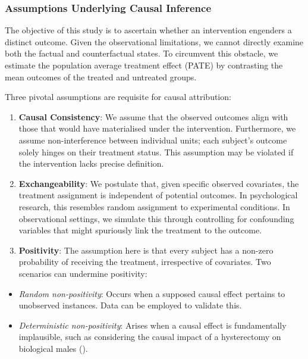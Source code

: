 \documentclass[
  singlecolumn,
  9pt]{article}
\providecommand{\tightlist}{%
  \setlength{\itemsep}{0pt}\setlength{\parskip}{0pt}}\usepackage{longtable,booktabs,array}
\begin{document}
\subsubsection{Assumptions Underlying Causal
Inference}\label{assumptions-underlying-causal-inference}

The objective of this study is to ascertain whether an intervention
engenders a distinct outcome. Given the observational limitations, we
cannot directly examine both the factual and counterfactual states. To
circumvent this obstacle, we estimate the population average treatment
effect (PATE) by contrasting the mean outcomes of the treated and
untreated groups.

Three pivotal assumptions are requisite for causal attribution:

\begin{enumerate}
\def\labelenumi{\arabic{enumi}.}
\item
  \textbf{Causal Consistency}: We assume that the observed outcomes
  align with those that would have materialised under the intervention.
  Furthermore, we assume non-interference between individual units; each
  subject's outcome solely hinges on their treatment status. This
  assumption may be violated if the intervention lacks precise
  definition.
\item
  \textbf{Exchangeability}: We postulate that, given specific observed
  covariates, the treatment assignment is independent of potential
  outcomes. In psychological research, this resembles random assignment
  to experimental conditions. In observational settings, we simulate
  this through controlling for confounding variables that might
  spuriously link the treatment to the outcome.
\item
  \textbf{Positivity}: The assumption here is that every subject has a
  non-zero probability of receiving the treatment, irrespective of
  covariates. Two scenarios can undermine positivity:
\end{enumerate}

\begin{itemize}
\tightlist
\item
  \emph{Random non-positivity}: Occurs when a supposed causal effect
  pertains to unobserved instances. Data can be employed to validate
  this.
\item
  \emph{Deterministic non-positivity}: Arises when a causal effect is
  fundamentally implausible, such as considering the causal impact of a
  hysterectomy on biological males ().
\end{itemize}
\end{document}
